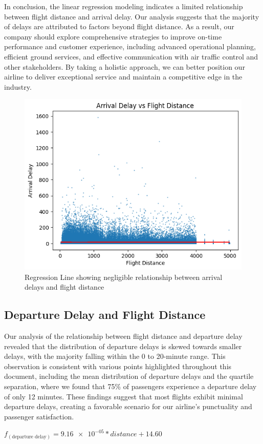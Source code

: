 \documentclass[11pt]{article}
\begin{document}
In conclusion, the linear regression modeling indicates a limited relationship between flight distance and arrival delay. Our analysis suggests that the majority of delays are attributed to factors beyond flight distance. As a result, our company should explore comprehensive strategies to improve on-time performance and customer experience, including advanced operational planning, efficient ground services, and effective communication with air traffic control and other stakeholders. By taking a holistic approach, we can better position our airline to deliver exceptional service and maintain a competitive edge in the industry.

\begin{figure}[h]
\centering
\includegraphics[width=0.5\linewidth]{project_files/project_40_1.png}
\caption{Regression Line showing negligible relationship between arrival delays and flight distance}
\end{figure}
    
    \subsection{Departure Delay and Flight Distance}

Our analysis of the relationship between flight distance and departure delay revealed that the distribution of departure delays is skewed towards smaller delays, with the majority falling within the 0 to 20-minute range. This observation is consistent with various points highlighted throughout this document, including the mean distribution of departure delays and the quartile separation, where we found that 75\% of passengers experience a departure delay of only 12 minutes. These findings suggest that most flights exhibit minimal departure delays, creating a favorable scenario for our airline's punctuality and passenger satisfaction.

\begin{center}
    $f_{(\text{departure delay})} = \num{9.16e-05} * distance + 14.60$
\end{center}
\end{document}
